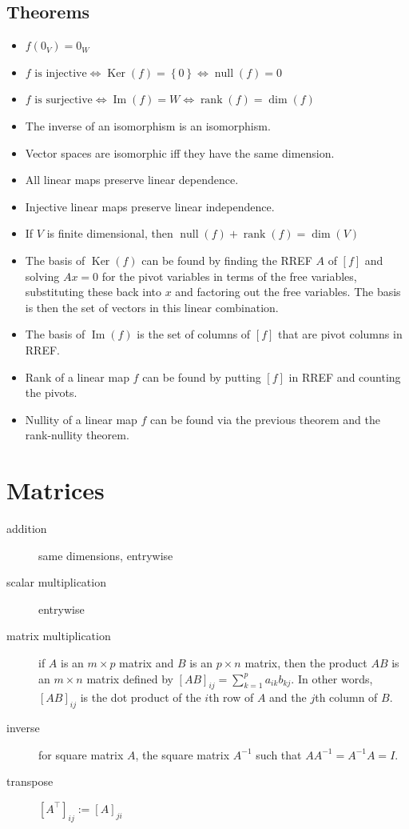 \documentclass[tbtags,columns=2]{cheatsheet}
\begin{document}
\subsection{Theorems}
\begin{itemize}
    \item $f(0_V) = 0_W$
    \item $f\text{ is injective}\iff \operatorname{Ker}(f) = \left\{ 0 \right\} \iff \operatorname{null}(f)=0$
    \item $f\text{ is surjective}\iff \operatorname{Im}(f)=W \iff \operatorname{rank}(f)=\dim(f)$
    \item The inverse of an isomorphism is an isomorphism.
    \item Vector spaces are isomorphic iff they have the same dimension.
    \item All linear maps preserve linear dependence.
    \item Injective linear maps preserve linear independence.
    \item If $V$ is finite dimensional, then $\operatorname{null}(f)+\operatorname{rank}(f)=\dim(V)$
    \item The basis of $\operatorname{Ker}(f)$ can be found by finding the RREF $A$ of $[f]$ and solving $Ax=0$ for the pivot variables in terms of the free variables, substituting these back into $x$ and factoring out the free variables. The basis is then the set of vectors in this linear combination.
    \item The basis of $\operatorname{Im}(f)$ is the set of columns of $[f]$ that are pivot columns in RREF.
    \item Rank of a linear map $f$ can be found by putting $[f]$ in RREF and counting the pivots.
    \item Nullity of a linear map $f$ can be found via the previous theorem and the rank-nullity theorem.
\end{itemize}

\section{Matrices}
\begin{description}
    \item[addition] same dimensions, entrywise
    \item[scalar multiplication] entrywise
    \item[matrix multiplication] if $A$ is an $m\times p$ matrix and $B$ is an $p\times n$ matrix, then the product $AB$ is an $m\times n$ matrix defined by $[AB]_{ij} = \sum_{k=1}^p a_{ik}b_{kj}$. In other words, $[AB]_{ij}$ is the dot product of the $i$th row of $A$ and the $j$th column of $B$.
    \item[inverse] for square matrix $A$, the square matrix $A^{-1}$ such that $AA^{-1} = A^{-1}A=I$.
    \item[transpose] $[A^\intercal]_{ij} := [A]_{ji}$ 
\end{description}
\end{document}
